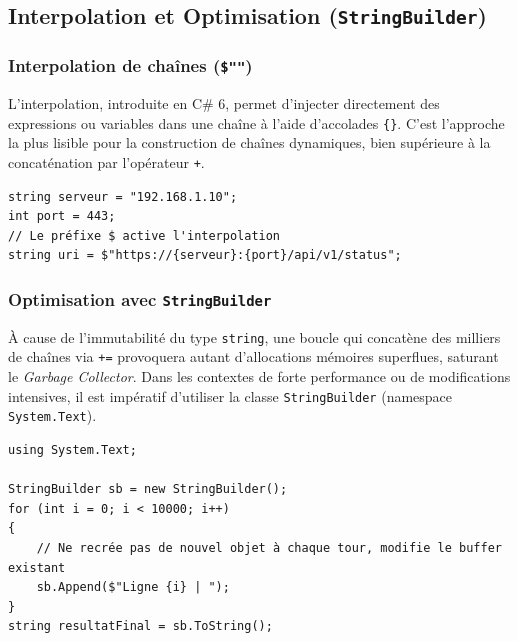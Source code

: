 \subsection{Interpolation et Optimisation (\texttt{StringBuilder})}

\subsubsection{Interpolation de chaînes (\texttt{\$""})}
L'interpolation, introduite en C\# 6, permet d'injecter directement des expressions ou variables dans une chaîne à l'aide d'accolades \texttt{\{\}}. C'est l'approche la plus lisible pour la construction de chaînes dynamiques, bien supérieure à la concaténation par l'opérateur \texttt{+}.

\begin{lstlisting}[style=csharpstyle]
string serveur = "192.168.1.10";
int port = 443;
// Le préfixe $ active l'interpolation
string uri = $"https://{serveur}:{port}/api/v1/status";
\end{lstlisting}

\subsubsection{Optimisation avec \texttt{StringBuilder}}
À cause de l'immutabilité du type \texttt{string}, une boucle qui concatène des milliers de chaînes via \texttt{+=} provoquera autant d'allocations mémoires superflues, saturant le \textit{Garbage Collector}. Dans les contextes de forte performance ou de modifications intensives, il est impératif d'utiliser la classe \texttt{StringBuilder} (namespace \texttt{System.Text}).

\begin{lstlisting}[style=csharpstyle]
using System.Text;

StringBuilder sb = new StringBuilder();
for (int i = 0; i < 10000; i++)
{
    // Ne recrée pas de nouvel objet à chaque tour, modifie le buffer existant
    sb.Append($"Ligne {i} | ");
}
string resultatFinal = sb.ToString();
\end{lstlisting}

